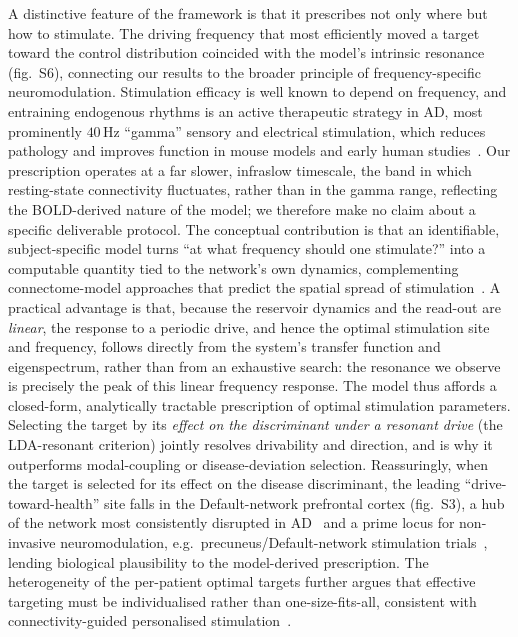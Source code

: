 \documentclass[11pt]{article}
\begin{document}
A distinctive feature of the framework is that it prescribes not only where but
how to stimulate. The driving frequency that most efficiently moved a target
toward the control distribution coincided with the model's intrinsic resonance
(fig.~S6), connecting our results to the broader principle of
frequency-specific neuromodulation. Stimulation efficacy is well known to depend
on frequency, and entraining endogenous rhythms is an active therapeutic
strategy in AD, most prominently $40$\,Hz ``gamma'' sensory and electrical
stimulation, which reduces pathology and improves function in mouse models and
early human studies~\cite{iaccarino2016,martorell2019}. Our prescription operates
at a far slower, infraslow timescale, the band in which resting-state
connectivity fluctuates, rather than in the gamma range, reflecting the
BOLD-derived nature of the model; we therefore make no claim about a specific
deliverable protocol. The conceptual contribution is that an identifiable,
subject-specific model turns ``at what frequency should one stimulate?'' into a
computable quantity tied to the network's own dynamics, complementing
connectome-model approaches that predict the spatial spread of
stimulation~\cite{spiegler2016,kunze2016}. A practical advantage is that, because
the reservoir dynamics and the read-out are \emph{linear}, the response to a
periodic drive, and hence the optimal stimulation site and frequency, follows
directly from the system's transfer function and eigenspectrum, rather than from
an exhaustive search: the resonance we observe is precisely the peak of this
linear frequency response. The model thus affords a closed-form, analytically
tractable prescription of optimal stimulation parameters. Selecting the target by its \emph{effect on the discriminant under a resonant drive} (the LDA-resonant criterion) jointly resolves drivability and direction, and is why it outperforms modal-coupling or disease-deviation selection.
Reassuringly, when the
target is selected for its effect on the disease discriminant, the leading
``drive-toward-health'' site falls in the Default-network prefrontal cortex
(fig.~S3), a hub of the network most consistently disrupted in
AD~\cite{greicius2004,sheline2013} and a prime locus for non-invasive
neuromodulation, e.g.\ precuneus/Default-network stimulation
trials~\cite{koch2022}, lending biological plausibility to the model-derived
prescription. The heterogeneity of the per-patient optimal targets further argues
that effective targeting must be individualised rather than one-size-fits-all,
consistent with connectivity-guided personalised stimulation~\cite{fox2014}.
\end{document}
